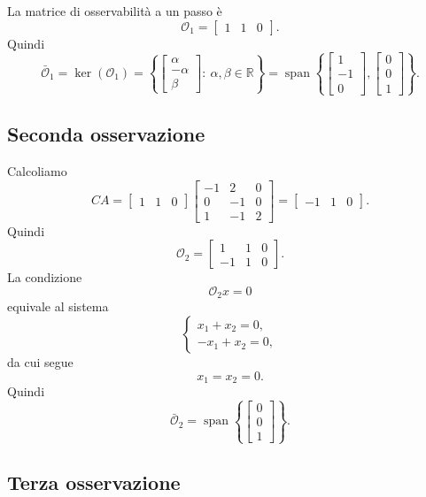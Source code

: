 La matrice di osservabilità a un passo è
\[
\mathcal O_1=
\begin{bmatrix}
1 & 1 & 0
\end{bmatrix}.
\]
Quindi
\[
\bar{\mathcal O}_1=\ker(\mathcal O_1)
=
\left\{
\begin{bmatrix}
\alpha\\
-\alpha\\
\beta
\end{bmatrix}
:\ \alpha,\beta\in\mathbb R
\right\}
=
\operatorname{span}\left\{
\begin{bmatrix}
1\\-1\\0
\end{bmatrix},
\begin{bmatrix}
0\\0\\1
\end{bmatrix}
\right\}.
\]

\subsection{Seconda osservazione}

Calcoliamo
\[
CA=
\begin{bmatrix}
1 & 1 & 0
\end{bmatrix}
\begin{bmatrix}
-1 & 2 & 0\\
0 & -1 & 0\\
1 & -1 & 2
\end{bmatrix}
=
\begin{bmatrix}
-1 & 1 & 0
\end{bmatrix}.
\]
Quindi
\[
\mathcal O_2=
\begin{bmatrix}
1 & 1 & 0\\
-1 & 1 & 0
\end{bmatrix}.
\]
La condizione
\[
\mathcal O_2 x=0
\]
equivale al sistema
\[
\begin{cases}
x_1+x_2=0,\\
-x_1+x_2=0,
\end{cases}
\]
da cui segue
\[
x_1=x_2=0.
\]
Quindi
\[
\bar{\mathcal O}_2=
\operatorname{span}\left\{
\begin{bmatrix}
0\\0\\1
\end{bmatrix}
\right\}.
\]

\subsection{Terza osservazione}

